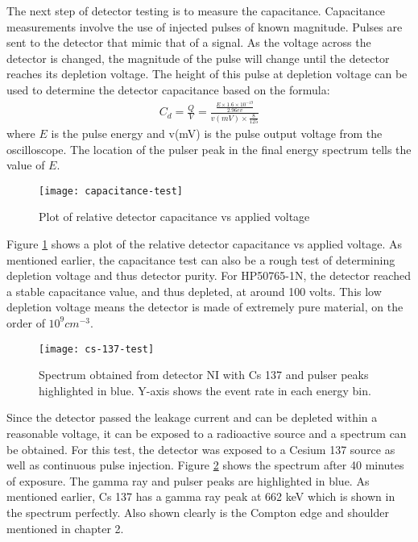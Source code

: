 The next step of detector testing is to measure the capacitance.
Capacitance measurements involve the use of injected pulses of known magnitude.
Pulses are sent to the detector that mimic that of a signal.
As the voltage across the detector is changed, the magnitude of the pulse will change until the detector reaches its depletion voltage.
The height of this pulse at depletion voltage can be used to determine the detector capacitance based on the formula:
\begin{align*}
C_d=\frac{Q}{V}=\frac{\frac{E\times 1.6\times 10^{-19}}{2.96ev}}{v(mV)\times \frac{8}{125}}
\end{align*}
where $E$ is the pulse energy and v(mV) is the pulse output voltage from the oscilloscope. The location of the pulser peak in the final energy spectrum tells the value of $E$.

\begin{figure}[htpb]
\centering
\texttt{[image: capacitance-test]}
\caption{Plot of relative detector capacitance vs applied voltage}
\label{fig:capacitance-test}
\end{figure}
Figure \ref{fig:capacitance-test} shows a plot of the relative detector capacitance vs applied voltage.
As mentioned earlier, the capacitance test can also be a rough test of determining depletion voltage and thus detector purity.
For HP50765-1N, the detector reached a stable capacitance value, and thus depleted, at around 100 volts.
This low depletion voltage means the detector is made of extremely pure material, on the order of $10^{9}cm^{-3}$.

\begin{figure}[htpb]
\centering
\texttt{[image: cs-137-test]}
\caption{Spectrum obtained from detector NI with Cs 137 and pulser peaks highlighted in blue. Y-axis shows the event rate in each energy bin.}
\label{fig:cs-137-test}
\end{figure}
Since the detector passed the leakage current and can be depleted within a reasonable voltage, it can be exposed to a radioactive source and a spectrum can be obtained.
For this test, the detector was exposed to a Cesium 137 source as well as continuous pulse injection.
Figure \ref{fig:cs-137-test} shows the spectrum after 40 minutes of exposure.
The gamma ray and pulser peaks are highlighted in blue.
As mentioned earlier, Cs 137 has a gamma ray peak at 662 keV which is shown in the spectrum perfectly.
Also shown clearly is the Compton edge and shoulder mentioned in chapter 2.


